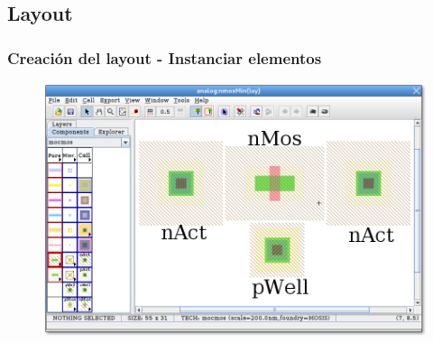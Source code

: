 \documentclass{beamer}
\begin{document}
\begin{frame}
\subsection{Layout}
\frametitle{Creación del layout - Instanciar elementos}
\begin{figure}
  \includegraphics[width=1.00\linewidth]{figuras/edicionElectric-7.png}
\end{figure}
\end{frame}
\end{document}
